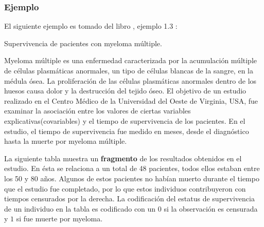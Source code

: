\documentclass[
  a4paper,
  oneside,
  openany]{book}
\begin{document}
\hypertarget{ejemplo-9}{%
\subsubsection*{Ejemplo}\label{ejemplo-9}}


El siguiente ejemplo es tomado del libro \citep{collett2015modelling}, ejemplo 1.3 :

Supervivencia de pacientes con myeloma múltiple.

Myeloma múltiple es una enfermedad caracterizada por la acumulación múltiple de células plasmáticas anormales, un tipo de células blancas de la sangre, en la médula ósea. La proliferación de las células plasmáticas anormales dentro de los huesos causa dolor y la destrucción del tejido óseo. El objetivo de un estudio realizado en el Centro Médico de la Universidad del Oeste de Virginia, USA, fue examinar la asociación entre los valores de ciertas variables explicativas(covariables) y el tiempo de supervivencia de los pacientes. En el estudio, el tiempo de supervivencia fue medido en meses, desde el diagnóstico hasta la muerte por myeloma múltiple.

La siguiente tabla muestra un \textbf{fragmento} de los resultados obtenidos en el estudio. En ésta se relaciona a un total de 48 pacientes, todos ellos estaban entre los 50 y 80 años. Algunos de estos pacientes no habían muerto durante el tiempo que el estudio fue completado, por lo que estos individuos contribuyeron con tiempos censurados por la derecha. La codificación del estatus de supervivencia de un individuo en la tabla es codificado con un \(0\) si la observación es censurada y \(1\) si fue muerte por myeloma.
\end{document}
